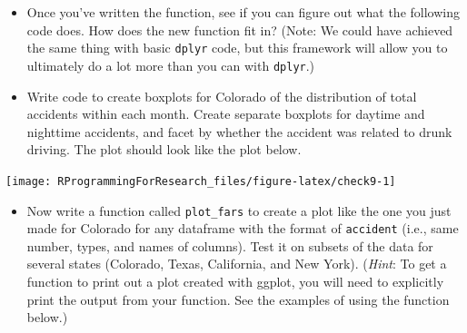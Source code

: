 \documentclass[]{book}
\makeatletter
\newenvironment{Shaded}{\begin{snugshade}}{\end{snugshade}}
\newcommand{\KeywordTok}[1]{\textcolor[rgb]{0.13,0.29,0.53}{\textbf{#1}}}
\newcommand{\DataTypeTok}[1]{\textcolor[rgb]{0.13,0.29,0.53}{#1}}
\newcommand{\StringTok}[1]{\textcolor[rgb]{0.31,0.60,0.02}{#1}}
\newcommand{\OperatorTok}[1]{\textcolor[rgb]{0.81,0.36,0.00}{\textbf{#1}}}
\newcommand{\NormalTok}[1]{#1}
\providecommand{\tightlist}{%
  \setlength{\itemsep}{0pt}\setlength{\parskip}{0pt}}
\newenvironment{kframe}{%
\medskip{}
\setlength{\fboxsep}{.8em}
 \def\at@end@of@kframe{}%
 \ifinner\ifhmode%
  \def\at@end@of@kframe{\end{minipage}}%
  \begin{minipage}{\columnwidth}%
 \fi\fi%
 \def\FrameCommand##1{\hskip\@totalleftmargin \hskip-\fboxsep
 \colorbox{shadecolor}{##1}\hskip-\fboxsep
     \hskip-\linewidth \hskip-\@totalleftmargin \hskip\columnwidth}%
 \MakeFramed {\advance\hsize-\width
   \@totalleftmargin\z@ \linewidth\hsize
   \@setminipage}}%
 {\par\unskip\endMakeFramed%
 \at@end@of@kframe}
\renewenvironment{Shaded}{\begin{kframe}}{\end{kframe}}
\theoremstyle{definition}
\theoremstyle{definition}
\theoremstyle{definition}
\theoremstyle{remark}
\makeatother
\begin{document}
\begin{itemize}
\tightlist
\item
  Once you've written the function, see if you can figure out what the
  following code does. How does the new function fit in? (Note: We could
  have achieved the same thing with basic \texttt{dplyr} code, but this
  framework will allow you to ultimately do a lot more than you can with
  \texttt{dplyr}.)
\end{itemize}

\begin{Shaded}
\end{Shaded}

\begin{itemize}
\tightlist
\item
  Write code to create boxplots for Colorado of the distribution of
  total accidents within each month. Create separate boxplots for
  daytime and nighttime accidents, and facet by whether the accident was
  related to drunk driving. The plot should look like the plot below.
\end{itemize}

\begin{center}\texttt{[image: RProgrammingForResearch\_files/figure-latex/check9-1]} \end{center}

\begin{itemize}
\tightlist
\item
  Now write a function called \texttt{plot\_fars} to create a plot like
  the one you just made for Colorado for any dataframe with the format
  of \texttt{accident} (i.e., same number, types, and names of columns).
  Test it on subsets of the data for several states (Colorado, Texas,
  California, and New York). (\emph{Hint}: To get a function to print
  out a plot created with ggplot, you will need to explicitly print the
  output from your function. See the examples of using the function
  below.)
\end{itemize}
\end{document}
